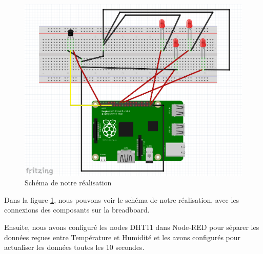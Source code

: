 \begin{figure}[H]
\centering
\includegraphics[width=15cm]{Images/RaspberryVisual.png}
\caption{Schéma de notre réalisation}
\label{Chap4.3.13}
\end{figure}

Dans la figure \ref{Chap4.3.13}, nous pouvons voir le schéma de notre réalisation, avec les connexions des composants sur la breadboard.

Ensuite, nous avons configuré les nodes DHT11 dans Node-RED pour séparer les données reçues entre Température et Humidité et les avons configurés pour actualiser les données toutes les 10 secondes.

